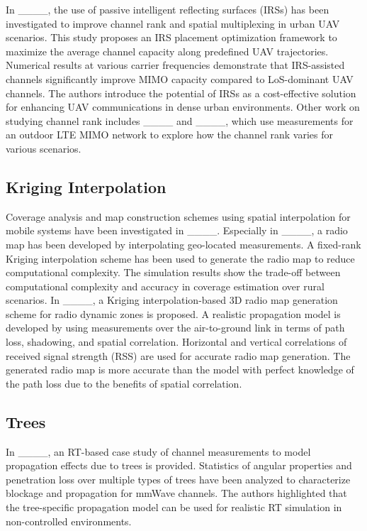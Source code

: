 In ____, the use of passive intelligent reflecting surfaces (IRSs) has been investigated to improve channel rank and spatial multiplexing in urban UAV scenarios. This study proposes an IRS placement optimization framework to maximize the average channel capacity along predefined UAV trajectories. Numerical results at various carrier frequencies demonstrate that IRS-assisted channels significantly improve MIMO capacity compared to LoS-dominant UAV channels. The authors introduce the potential of IRSs as a cost-effective solution for enhancing UAV communications in dense urban environments. Other work on studying channel rank includes ____ and ____, which use measurements for an outdoor LTE MIMO network to explore how the channel rank varies for various scenarios. 



\subsection{Kriging Interpolation}
Coverage analysis and map construction schemes using spatial interpolation for mobile systems have been investigated in ____. Especially in ____, a radio map has been developed by interpolating geo-located measurements. A fixed-rank Kriging interpolation scheme has been used to generate the radio map to reduce computational complexity. The simulation results show the trade-off between computational complexity and accuracy in coverage estimation over rural scenarios. 
In ____, a Kriging interpolation-based 3D radio map generation scheme for radio dynamic zones is proposed. A realistic propagation model is developed by using measurements over the air-to-ground link in terms of path loss, shadowing, and spatial correlation. Horizontal and vertical correlations of received signal strength (RSS) are used for accurate radio map generation. The generated radio map is more accurate than the model with perfect knowledge of the path loss due to the benefits of spatial correlation. 

\subsection{Trees}
In ____, an RT-based case study of channel measurements to model propagation effects due to trees is provided. Statistics of angular properties and penetration loss over multiple types of trees have been analyzed to characterize blockage and propagation for mmWave channels. The authors highlighted that the tree-specific propagation model can be used for realistic RT simulation in non-controlled environments. 

